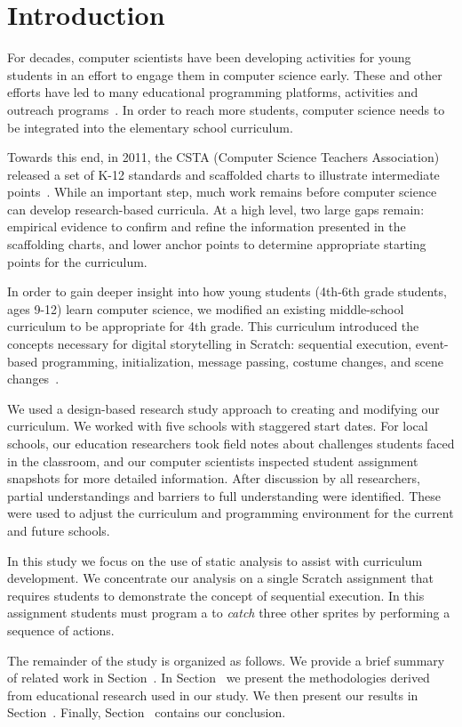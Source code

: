 \section{Introduction}
For decades, computer scientists have been developing activities for young
students in an effort to engage them in computer science early. These and other
efforts have led to many educational programming platforms, activities and
outreach programs~\cite{wayanoutpost, georgiaoutreach,
Franklin:2011:ATA:1953163.1953295, Maloney:2010:SPL:1868358.1868363,
Dann:2000:MCP:343048.343070, Hood:2005:TPL:1067445.1067454, csunplugged}. In
order to reach more students, computer science needs to be integrated into the
elementary school curriculum.

Towards this end, in 2011, the CSTA (Computer Science Teachers Association)
released a set of K-12 standards and scaffolded charts to illustrate
intermediate points~\cite{cstastandards}. While an important step, much work
remains before computer science can develop research-based curricula. At a
high level, two large gaps remain: empirical evidence to confirm and refine the
information presented in the scaffolding charts, and lower anchor points to
determine appropriate starting points for the curriculum.

In order to gain deeper insight into how young students (4th-6th grade
students, ages 9-12) learn computer science, we modified an existing
middle-school curriculum to be appropriate for 4th grade. This curriculum
introduced the concepts necessary for digital storytelling in Scratch:
sequential execution, event-based programming, initialization, message passing,
costume changes, and scene changes~\cite{Franklin:2013:SBO}.

We used a design-based research study approach to creating and modifying our
curriculum. We worked with five schools with staggered start dates. For local
schools, our education researchers took field notes about challenges students
faced in the classroom, and our computer scientists inspected student
assignment snapshots for more detailed information. After discussion by all
researchers, partial understandings and barriers to full understanding were
identified. These were used to adjust the curriculum and programming
environment for the current and future schools.

In this study we focus on the use of static analysis to assist with curriculum
development. We concentrate our analysis on a single Scratch assignment that
requires students to demonstrate the concept of sequential execution. In this
assignment students must program a \net{} to \emph{catch} three other sprites
by performing a sequence of actions.

The remainder of the study is organized as follows. We provide a brief summary
of related work in Section~. In
Section~ we present the methodologies derived from
educational research used in our study. We then present our results in
Section~. Finally, Section~
contains our conclusion.
